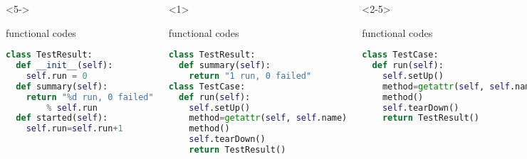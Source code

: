 \documentclass[lualatex]{beamer}
\begin{document}
\begin{frame}[fragile,t]
\begin{columns}[t]
        \begin{onlyenv}<5->
            \begin{block}{functional codes}
                \begin{lstlisting}[language=Python,columns=fullflexible]
class TestResult:
  def __init__(self):
    self.run = 0
  def summary(self):
    return "%d run, 0 failed"
        % self.run
  def started(self):
    self.run=self.run+1
                \end{lstlisting}
            \end{block}
        \end{onlyenv}

        \begin{onlyenv}<1>
            \begin{block}{functional codes}
                \begin{lstlisting}[language=Python,columns=fullflexible]
class TestResult:
  def summary(self):
    return "1 run, 0 failed"
class TestCase:
  def run(self):
    self.setUp()
    method=getattr(self, self.name)
    method()
    self.tearDown()
    return TestResult()
                \end{lstlisting}
            \end{block}
        \end{onlyenv}

        \begin{onlyenv}<2-5>
            \begin{block}{functional codes}
                \begin{lstlisting}[language=Python,columns=fullflexible]
class TestCase:
  def run(self):
    self.setUp()
    method=getattr(self, self.name)
    method()
    self.tearDown()
    return TestResult()
                \end{lstlisting}
            \end{block}
        \end{onlyenv}

        \begin{onlyenv}<6>
            \begin{block}{functional codes}
                \begin{lstlisting}[language=Python,columns=fullflexible]
class TestCase:
  def run(self):
    result=TestResult()
    result.started()
    self.setUp()
    method=getattr(self, self.name)
    method()
    self.tearDown()
    return result
                \end{lstlisting}
            \end{block}
        \end{onlyenv}
    \end{columns}
\end{frame}
\end{document}
